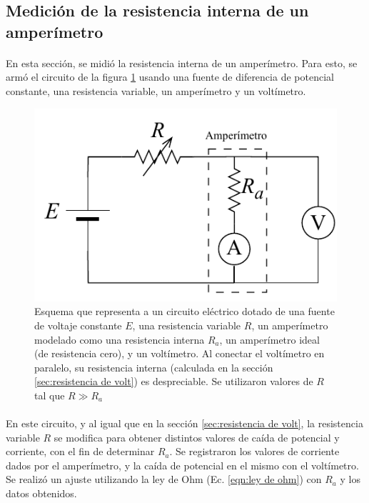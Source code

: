\subsection{Medición de la resistencia interna de un amperímetro} \label{sec:resistencia de amp}
\paragraph{}
En esta sección, se midió la resistencia interna de un amperímetro. Para esto, se armó el circuito de la figura \ref{fig:esq_amperimetro} usando una fuente de diferencia de potencial constante, una resistencia variable, un amperímetro y un voltímetro. 

\begin{figure}[H]
    \centering
    \includegraphics[width = 0.5\linewidth]{Esquemas/Resistencia amperimetro.pdf}
    \caption{Esquema que representa a un circuito eléctrico dotado de una fuente de voltaje constante $E$, una resistencia variable $R$, un amperímetro modelado como una resistencia interna $R_a$, un amperímetro ideal (de resistencia cero), y un voltímetro. Al conectar el voltímetro en paralelo, su resistencia interna (calculada en la sección \ref{sec:resistencia de volt}) es despreciable. Se utilizaron valores de $R$ tal que $R \gg R_a$}
    \label{fig:esq_amperimetro}
\end{figure}
\paragraph{}
En este circuito, y al igual que en la sección \ref{sec:resistencia de volt}, la resistencia variable $R$ se modifica para obtener distintos valores de caída de potencial y corriente, con el fin de determinar $R_a$. Se registraron los valores de corriente dados por el amperímetro, y la caída de potencial en el mismo con el voltímetro. Se realizó un ajuste utilizando la ley de Ohm (Ec. \ref{eqn:ley de ohm}) con $R_a$ y los datos obtenidos.

